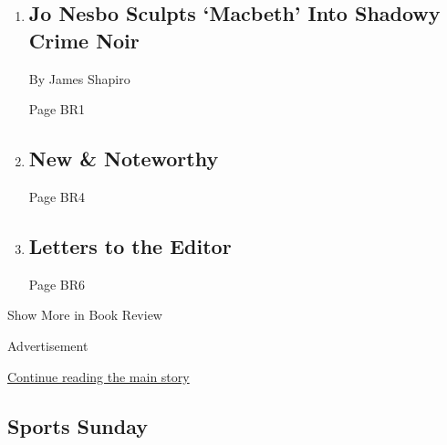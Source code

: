 \begin{enumerate}
\def\labelenumi{\arabic{enumi}.}
\item
  \href{/2018/04/16/books/review/jo-nesbo-macbeth.html}{}

  \hypertarget{jo-nesbo-sculpts-macbeth-into-shadowy-crime-noir}{%
  \subsection{Jo Nesbo Sculpts `Macbeth' Into Shadowy Crime
  Noir}\label{jo-nesbo-sculpts-macbeth-into-shadowy-crime-noir}}

  By James Shapiro

  Page BR1
\item
  \href{/2018/04/17/books/review/new-noteworthy-jd-biersdorfer.html}{}

  \hypertarget{new--noteworthy}{%
  \subsection{New \& Noteworthy}\label{new--noteworthy}}

  Page BR4
\item
  \href{/2018/04/20/books/review/letters-to-the-editor.html}{}

  \hypertarget{letters-to-the-editor}{%
  \subsection{Letters to the Editor}\label{letters-to-the-editor}}

  Page BR6
\end{enumerate}

Show More in Book Review

Advertisement

\protect\hyperlink{after-mid6}{Continue reading the main story}

\hypertarget{sports-sunday}{%
\subsection{Sports Sunday}\label{sports-sunday}}

